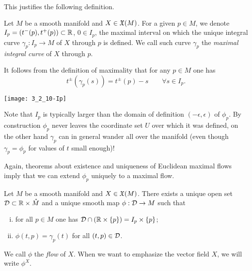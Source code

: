 This justifies the following definition.
\begin{definition}
	Let $M$ be a smooth manifold and $X\in\mathfrak{X}(M)$.
	For a given $p\in M$, we denote $I_p = \left(t^-(p), t^+(p)\right) \subset\mathbb{R}$, $0 \in I_p$, the maximal interval on which the unique integral curve $\gamma_p : I_p \to M$ of $X$ through $p$ is defined.
	We call such curve $\gamma_p$ the \emph{maximal integral curve} of $X$ through $p$.
\end{definition}

\begin{remark}
	It follows from the definition of maximality that for any $p\in M$ one has
	\begin{equation}
		t^{\pm}(\gamma_p(s)) = t^\pm(p) - s \qquad \forall s\in I_p.
	\end{equation}
\end{remark}

\begin{marginfigure}
	\texttt{[image: 3\_2\_10-Ip]}
\end{marginfigure}
Note that $I_p$ is typically larger than the domain of definition $(-\epsilon, \epsilon)$ of $\phi_p$.
By construction $\phi_p$ never leaves the coordinate set $U$ over which it was defined, on the other hand $\gamma_p$ can in general wander all over the manifold (even though $\gamma_p = \phi_p$ for values of $t$ small enough)!

Again, theorems about existence and uniqueness of Euclidean maximal flows imply that we can extend $\phi_p$ uniquely to a maximal flow.

\begin{theorem} %
	\label{thm:exuniqmax}
	Let $M$ be a smooth manifold and $X\in\mathfrak{X}(M)$.
	There exists a unique open set $\mathcal{D} \subset \mathbb{R}\times\mathring M$ and a unique smooth map $\phi:\mathcal{D}\to M$ such that
	\begin{enumerate}[(i)]
		\item\label{thm:exuniqmax:i} for all $p\in M$ one has $\mathcal{D}\cap(\mathbb{R}\times\{p\}) = I_p\times\{p\}$;
		\item\label{thm:exuniqmax:ii} $\phi(t,p) = \gamma_p(t)$ for all $(t,p)\in\mathcal{D}$.
	\end{enumerate}
\end{theorem}

We call $\phi$ the \emph{flow} of $X$.
When we want to emphasize the vector field $X$, we will write $\phi^X$.

